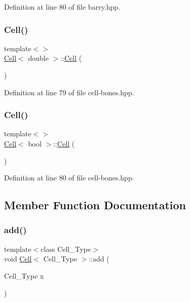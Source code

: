 Definition at line 80 of file barry.\+hpp.

\mbox{\label{class_cell_a5ecdaddaf4661a9a8fe6f0ed61595847}} 
\subsubsection{\texorpdfstring{Cell()}{Cell()}\hspace{0.1cm}{\footnotesize\ttfamily [8/9]}}
{\footnotesize\ttfamily template$<$$>$ \\
\hyperlink{class_cell}{Cell}$<$ double $>$\+::\hyperlink{class_cell}{Cell} (\begin{DoxyParamCaption}{ }\end{DoxyParamCaption})\hspace{0.3cm}{\ttfamily [inline]}}



Definition at line 79 of file cell-\/bones.\+hpp.

\mbox{\label{class_cell_aef4b64101b33e2349ceea132b962d137}} 
\subsubsection{\texorpdfstring{Cell()}{Cell()}\hspace{0.1cm}{\footnotesize\ttfamily [9/9]}}
{\footnotesize\ttfamily template$<$$>$ \\
\hyperlink{class_cell}{Cell}$<$ bool $>$\+::\hyperlink{class_cell}{Cell} (\begin{DoxyParamCaption}{ }\end{DoxyParamCaption})\hspace{0.3cm}{\ttfamily [inline]}}



Definition at line 80 of file cell-\/bones.\+hpp.



\subsection{Member Function Documentation}
\mbox{\label{class_cell_a3d063afd2a8743623d0e524debbd55e9}} 
\subsubsection{\texorpdfstring{add()}{add()}\hspace{0.1cm}{\footnotesize\ttfamily [1/9]}}
{\footnotesize\ttfamily template$<$class Cell\+\_\+\+Type$>$ \\
void \hyperlink{class_cell}{Cell}$<$ Cell\+\_\+\+Type $>$\+::add (\begin{DoxyParamCaption}\item[{Cell\+\_\+\+Type}]{x }\end{DoxyParamCaption})}

